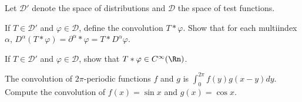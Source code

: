 Let $\mathcal{D}'$ denote the space of distributions and $\mathcal{D}$
the space of test functions.
\begin{alist}
\item If $T\in \mathcal{D}'$ and $\varphi\in \mathcal{D}$, define the
convolution $T\ast \varphi$. Show that for each multiindex $\alpha$,
$D^{\alpha}(T\ast \varphi)=\partial^{\alpha}\ast\varphi=T\ast
D^{\alpha}\varphi$.
\item If $T\in \mathcal{D}'$ and $\varphi\in \mathcal{D}$, show that
$T\ast\varphi\in C^{\infty}(\Rn)$.
\item The convolution of $2\pi$-periodic functions $f$ and $g$ is
$\int_0^{2\pi}f(y)g(x-y)dy$. Compute the convolution of $f(x)=\sin x$ 
and $g(x)=\cos x$. 
\end{alist}
